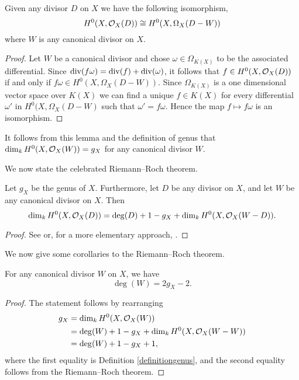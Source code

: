     \begin{lem}\label{lemisomorphismofdifferentialsandfunctions}
    Given any divisor $D$ on $X$ we have the following isomorphism,
        \[
        H^0(X,{\cal O}_X(D)) \cong H^0(X,\Omega_X(D - W))
        \]
    where $W$ is any canonical divisor on $X$.
    \end{lem}
    \begin{proof}
    Let $W$ be a canonical divisor and chose $\omega\in \Omega_{K(X)}$ to be the associated differential.
    Since $\operatorname{div}(f \omega) = \operatorname{div}(f) + \operatorname{div}(\omega)$, it follows that $f \in H^0(X,{\cal O}_X(D))$ if and only if $f \omega \in H^0(X,\Omega_X(D - W))$.
    Since $\Omega_{K(X)}$ is a one dimensional vector space over $K(X)$ we can find a unique $f \in K(X)$ for every differential $\omega'$ in $H^0(X,\Omega_X(D - W)$ such that $\omega' = f \omega$.
    Hence the map $f \mapsto f\omega$ is an isomorphism.
    \end{proof}

It follows from this lemma and the definition of genus that $\dim_kH^0(X,{\cal O}_X(W)) = g_X$ for any canonical divisor $W$.

We now state the celebrated Riemann--Roch theorem.

    \begin{thm}\label{theoremriemannroch}
    Let $g_X$ be the genus of $X$.
    Furthermore, let $D$ be any divisor on $X$, and let $W$ be any canonical divisor on $X$.
    Then
        \[
        \dim_k H^0(X,{\cal O}_X(D)) = \deg(D) + 1 - g_X + \dim_k H^0(X,{\cal O}_X(W-D)).
        \]
    \end{thm}
    \begin{proof}
    See \cite[Chap.\ IV, \S 1, Thm.\ 1.3]{hart} or, for a more elementary approach, \cite[Chap.\ 8, \S 6]{fulton}.
    \end{proof}

We now give some corollaries to the Riemann--Roch theorem.

    \begin{cor}\label{cordegreeofcanonicaldivisor}
    For any canonical divisor $W$ on $X$, we have 
        \[
        \deg(W) = 2g_X-2.
        \]
    \end{cor}
    \begin{proof}
    The statement follows by rearranging
        \begin{align*}
        g_X & = \dim_k H^0(X,{\cal O}_X(W))  \\ & = \deg(W) + 1 -g_X +  \dim_k H^0(X,{\cal O}_X(W-W))\\ & = \deg(W) + 1 -g_X + 1,
        \end{align*}
    where the first equality is Definition \ref{definitiongenus}, and the second equality follows from the Riemann--Roch theorem.
    \end{proof}


